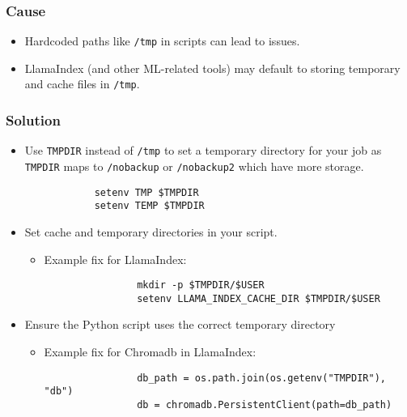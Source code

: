 \subsubsection{Cause}
\begin{itemize}
	\item Hardcoded paths like \texttt{/tmp} in scripts can lead to issues.
	\item LlamaIndex (and other ML-related tools) may default to storing temporary and cache files in \texttt{/tmp}.
\end{itemize}

\subsubsection{Solution}
\begin{itemize}

	\item Use \texttt{TMPDIR} instead of \texttt{/tmp} to set a temporary directory for your job 
		as \texttt{TMPDIR} maps to \texttt{/nobackup} or \texttt{/nobackup2} which have more storage.
		\begin{verbatim}
			setenv TMP $TMPDIR
			setenv TEMP $TMPDIR
		\end{verbatim}

	\item Set cache and temporary directories in your script.
		\begin{itemize}
			\item Example fix for LlamaIndex:
			\begin{verbatim}
				mkdir -p $TMPDIR/$USER
				setenv LLAMA_INDEX_CACHE_DIR $TMPDIR/$USER
			\end{verbatim}
		\end{itemize}

	\item Ensure the Python script uses the correct temporary directory
		\begin{itemize}
			\item Example fix for Chromadb in LlamaIndex:
			\begin{verbatim}
				db_path = os.path.join(os.getenv("TMPDIR"), "db")
				db = chromadb.PersistentClient(path=db_path)
			\end{verbatim}
		\end{itemize}
\end{itemize}
